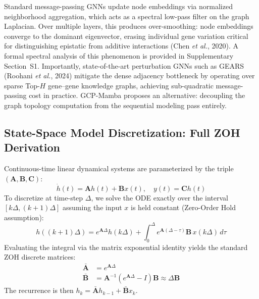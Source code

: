 \documentclass{bioinfo}
\begin{document}
Standard message-passing GNNs \citep{kipf2017} update node embeddings via normalized neighborhood aggregation, which acts as a spectral low-pass filter on the graph Laplacian. Over multiple layers, this produces over-smoothing: node embeddings converge to the dominant eigenvector, erasing individual gene variation critical for distinguishing epistatic from additive interactions (Chen \textit{et al.}, 2020). A formal spectral analysis of this phenomenon is provided in Supplementary Section~S1. Importantly, state-of-the-art perturbation GNNs such as GEARS (Roohani \textit{et al.}, 2024) mitigate the dense adjacency bottleneck by operating over sparse Top-$H$ gene--gene knowledge graphs, achieving sub-quadratic message-passing cost in practice. GCP-Mamba proposes an alternative: decoupling the graph topology computation from the sequential modeling pass entirely.

\subsection{State-Space Model Discretization: Full ZOH Derivation}

Continuous-time linear dynamical systems are parameterized by the triple $(\mathbf{A}, \mathbf{B}, \mathbf{C})$:
\begin{equation}
\dot{h}(t) = \mathbf{A}h(t) + \mathbf{B}x(t), \quad y(t) = \mathbf{C}h(t)
\end{equation}
To discretize at time-step $\Delta$, we solve the ODE exactly over the interval $[k\Delta, (k+1)\Delta]$ assuming the input $x$ is held constant (Zero-Order Hold assumption):
\begin{equation}
h((k+1)\Delta) = e^{\mathbf{A}\Delta} h(k\Delta) + \int_{0}^{\Delta} e^{\mathbf{A}(\Delta - \tau)} \mathbf{B}\, x(k\Delta)\, d\tau
\end{equation}
Evaluating the integral via the matrix exponential identity yields the standard ZOH discrete matrices:
\begin{align}
\bar{\mathbf{A}} &= e^{\mathbf{A}\Delta} \\
\bar{\mathbf{B}} &= \mathbf{A}^{-1}(e^{\mathbf{A}\Delta} - I)\mathbf{B} \approx \Delta \mathbf{B}
\end{align}
The recurrence is then $h_k = \bar{\mathbf{A}} h_{k-1} + \bar{\mathbf{B}} x_k$.
\end{document}
